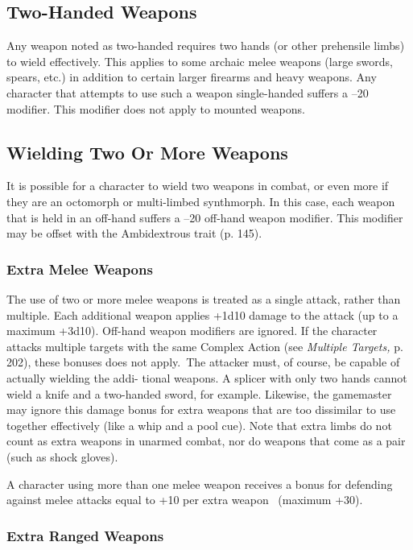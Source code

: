 \subsection{Two-Handed Weapons}

Any weapon noted as two-handed requires two hands 
(or other prehensile limbs) to wield effectively. This 
applies to some archaic melee weapons (large swords, 
spears, etc.) in addition to certain larger firearms and 
heavy weapons. Any character that attempts to use 
such a weapon single-handed suffers a –20 modifier. 
This modifier does not apply to mounted weapons.

\subsection{Wielding Two Or More Weapons}

It is possible for a character to wield two weapons 
in combat, or even more if they are an octomorph or 
multi-limbed synthmorph. In this case, each weapon 
that is held in an off-hand suffers a –20 off-hand 
weapon modifier. This modifier may be offset with the 
Ambidextrous trait (p. 145).

\subsubsection{Extra Melee Weapons}

The use of two or more melee weapons is treated as 
a single attack, rather than multiple. Each additional 
weapon applies +1d10 damage to the attack (up to 
a maximum +3d10). Off-hand weapon modifiers are 
ignored. If the character attacks multiple targets with 
the same Complex Action (see \textit{Multiple Targets,} p. 
202), these bonuses does not apply. The attacker must, 
of course, be capable of actually wielding the addi-
tional weapons. A splicer with only two hands cannot 
wield a knife and a two-handed sword, for example. 
Likewise, the gamemaster may ignore this damage 
bonus for extra weapons that are too dissimilar to 
use together effectively (like a whip and a pool cue). 
Note that extra limbs do not count as extra weapons 
in unarmed combat, nor do weapons that come as a 
pair (such as shock gloves).

A character using more than one melee weapon 
receives a bonus for defending against melee attacks 
equal to +10 per extra weapon  (maximum +30).

\subsubsection{Extra Ranged Weapons}

